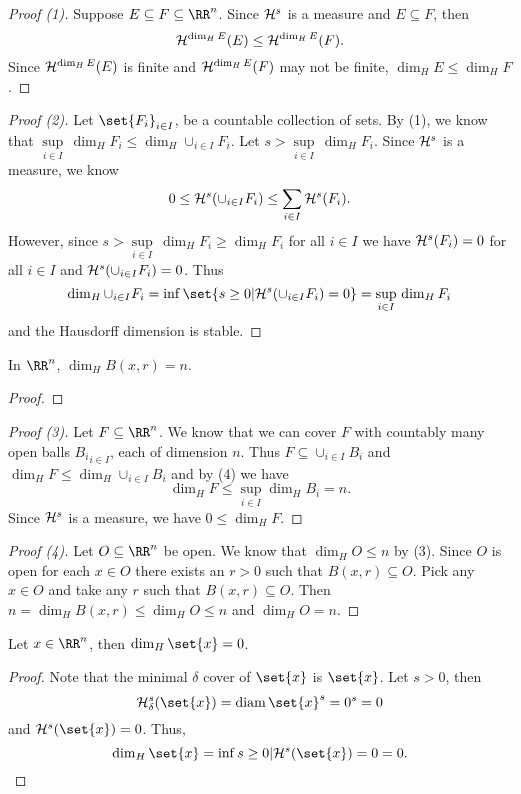\begin{proof}[Proof (1)]
	Suppose $E\subseteq F\subseteq\RR^n$.
	Since $\mathcal{H}^s$ is a measure and $E\subseteq F$, then
	\[
		\mathcal{H}^{\operatorname{dim}_H E} (E) \leq \mathcal{H}^{\operatorname{dim}_H E} (F).
	\]
	Since $\mathcal{H}^{\operatorname{dim}_H E}(E)$ is finite and $\mathcal{H}^{\operatorname{dim}_H E}(F)$ may not be finite, $\dim_H E \leq \dim_H F$.
\end{proof}

\begin{proof}[Proof (2)]
	Let $\set{F_i}_{i\in I}$, be a countable collection of sets.
	By (1), we know that $\sup\limits_{i\in I}\, \dim_H F_i \leq\dim_H \cup_{i\in I} F_i$.
	Let $s > \sup\limits_{i\in I}\, \dim_H F_i$.
	Since $\mathcal{H}^s$ is a measure, we know
	\[
		0\leq \mathcal{H}^s (\cup_{i\in I} F_i) \leq \sum_{i\in I} \mathcal{H}^s(F_i).
	\]
	However, since $s > \sup\limits_{i\in I}\, \dim_H F_i \geq \dim_H F_i$ for all $i\in I$ we have $\mathcal{H}^s(F_i)=0$ for all $i\in I$ and $\mathcal{H}^s (\cup_{i\in I} F_i) = 0$.
	Thus
	\[
		\dim_H \cup_{i\in I} F_i = \inf\set{s\geq 0 | \hm^s(\cup_{i\in I} F_i) = 0} =\sup\limits_{i\in I}\, \dim_H F_i
	\]
	and the Hausdorff dimension is stable.
\end{proof}

\begin{lemma}
	In $\RR^n$, $\dim_H B(x,r) = n$.
\end{lemma}
\begin{proof}
\end{proof}

\begin{proof}[Proof (3)]
	Let $F\subseteq\RR^n$.
	We know that we can cover $F$ with countably many open balls ${B_i}_{i\in I}$, each of dimension $n$.
	Thus $F\subseteq \cup_{i\in I} B_i$ and $\dim_H F \leq \dim_H \cup_{i\in I} B_i$ and by (4) we have
	\[
		\dim_H F \leq \sup\limits_{i\in I} \dim_H B_i = n.
	\]
	Since $\mathcal{H}^s$ is a measure, we have $0\leq \dim_H F$.
\end{proof}

\begin{proof}[Proof (4)]
	Let $O\subseteq\RR^n$ be open.
	We know that $\dim_H O\leq n$ by (3).
	Since $O$ is open for each $x\in O$ there exists an $r>0$ such that $B(x,r)\subseteq O$.
	Pick any $x\in O$ and take any $r$ such that $B(x,r)\subseteq O$.
	Then $n=\dim_H B(x,r) \leq \dim_H O \leq n$ and $\dim_H O = n$.
\end{proof}

\begin{lemma}
	Let $x\in\RR^n$, then $\dim_H \set{x} = 0$.
\end{lemma}
\begin{proof}
	Note that the minimal $\delta$ cover of $\set{x}$ is $\set{x}$.
	Let $s > 0$, then
	\[
		\hm^s_\delta(\set{x})=\diam \set{x}^s = 0^s = 0
	\]
	and $\hm^s(\set{x}) = 0$.
	Thus,
	\[
		\dim_H \set{x} = \inf{s\geq 0| \hm^s(\set{x}) = 0} = 0.
	\]
\end{proof}

